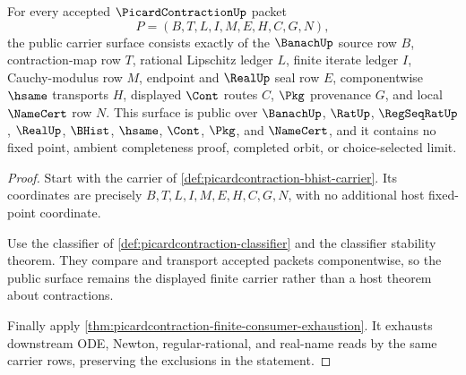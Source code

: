 \begin{theorem}
\label{thm:picardcontraction-public-carrier-surface}
For every accepted $\PicardContractionUp$ packet
$$
P=(B,T,L,I,M,E,H,C,G,N),
$$
the public carrier surface consists exactly of the $\BanachUp$ source row $B$, contraction-map row $T$, rational Lipschitz ledger $L$, finite iterate ledger $I$, Cauchy-modulus row $M$, endpoint and $\RealUp$ seal row $E$, componentwise $\hsame$ transports $H$, displayed $\Cont$ routes $C$, $\Pkg$ provenance $G$, and local $\NameCert$ row $N$. This surface is public over $\BanachUp$, $\RatUp$, $\RegSeqRatUp$, $\RealUp$, $\BHist$, $\hsame$, $\Cont$, $\Pkg$, and $\NameCert$, and it contains no fixed point, ambient completeness proof, completed orbit, or choice-selected limit.
\end{theorem}
\begin{proof}
Start with the carrier of \autoref{def:picardcontraction-bhist-carrier}. Its coordinates are precisely $B,T,L,I,M,E,H,C,G,N$, with no additional host fixed-point coordinate.

Use the classifier of \autoref{def:picardcontraction-classifier} and the classifier stability theorem. They compare and transport accepted packets componentwise, so the public surface remains the displayed finite carrier rather than a host theorem about contractions.

Finally apply \autoref{thm:picardcontraction-finite-consumer-exhaustion}. It exhausts downstream ODE, Newton, regular-rational, and real-name reads by the same carrier rows, preserving the exclusions in the statement.
\end{proof}

